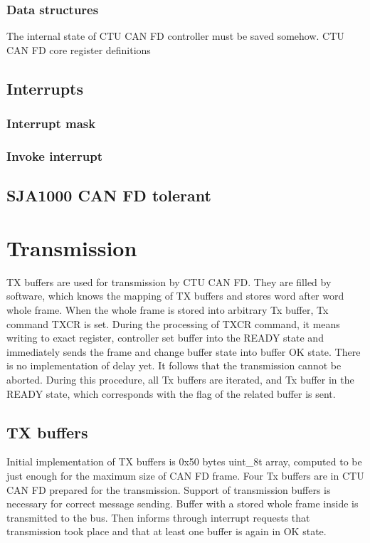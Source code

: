 \documentclass{ctuthesis}
\begin{document}
  \subsubsection{Data structures}
  The internal state of CTU CAN FD controller must be saved somehow. CTU CAN FD core register definitions
 
 \subsection{Interrupts}
 
  \subsubsection{Interrupt mask}
  
  \subsubsection{Invoke interrupt}
 
 \subsection{SJA1000 CAN FD tolerant}

 \section{Transmission}
  TX buffers are used for transmission by CTU CAN FD. They are filled by software, which knows the mapping of TX buffers and stores word after word whole frame. When the whole frame is stored into arbitrary Tx buffer, Tx command TXCR is set. During the processing of TXCR command, it means writing to exact register, controller set buffer into the READY state and immediately sends the frame and change buffer state into buffer OK state. There is no implementation of delay yet. It follows that the transmission cannot be aborted. During this procedure, all Tx buffers are iterated, and Tx buffer in the READY state, which corresponds with the flag of the related buffer is sent.

 \subsection{TX buffers}
  Initial implementation of TX buffers is 0x50 bytes uint\_8t array, computed to be just enough for the maximum size of CAN FD frame. Four Tx buffers are in CTU CAN FD prepared for the transmission. Support of transmission buffers is necessary for correct message sending. Buffer with a stored whole frame inside is transmitted to the bus. Then informs through interrupt requests that transmission took place and that at least one buffer is again in OK state.
\end{document}
